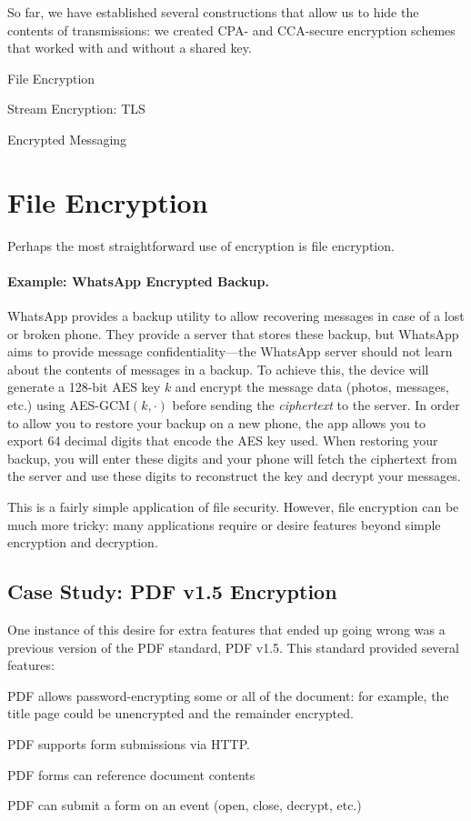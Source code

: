 So far, we have established several constructions that allow us to hide the contents of transmissions: we created CPA- and CCA-secure encryption schemes that worked with and without a shared key. 

\begin{compactitem}
	\item File Encryption
	\item Stream Encryption: TLS
	\item Encrypted Messaging
\end{compactitem}

\section{File Encryption}
Perhaps the most straightforward use of encryption is file encryption.

\paragraph{Example: WhatsApp Encrypted Backup.} WhatsApp provides a backup utility to allow recovering messages in case of a lost or broken phone. They provide a server that stores these backup, but WhatsApp aims to provide message confidentiality---the WhatsApp server should not learn about the contents of messages in a backup. To achieve this, the device will generate a 128-bit AES key $k$ and encrypt the message data (photos, messages, etc.) using AES-GCM$(k, \cdot)$ before sending the \emph{ciphertext} to the server. In order to allow you to restore your backup on a new phone, the app allows you to export 64 decimal digits that encode the AES key used. When restoring your backup, you will enter these digits and your phone will fetch the ciphertext from the server and use these digits to reconstruct the key and decrypt your messages.

This is a fairly simple application of file security. However, file encryption can be much more tricky: many applications require or desire features beyond simple encryption and decryption.

\subsection{Case Study: PDF v1.5 Encryption}
One instance of this desire for extra features that ended up going wrong was a previous version of the PDF standard, PDF v1.5. This standard provided several features:
\begin{compactenum}
	\item PDF allows password-encrypting some or all of the document: for example, the title page could be unencrypted and the remainder encrypted.
	\item PDF supports form submissions via HTTP.
	\item PDF forms can reference document contents
	\item PDF can submit a form on an event (open, close, decrypt, etc.)
\end{compactenum}

